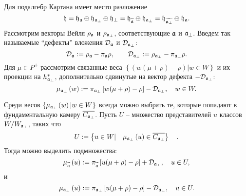 Для подалгебр Картана имеет место разложение
\begin{equation}
\frak{h}=\frak{\frak{h}_{\frak{a}}}\oplus \frak{h}_{\frak{a}_{\perp }}\oplus
\frak{h}_{\perp }=\frak{\frak{h}_{\widetilde{\frak{a}}}}\oplus \frak{h}_{%
\frak{a}_{\perp }}=\frak{\frak{h}_{\widetilde{\frak{a}_{\perp }}}}\oplus
\frak{h}_{\frak{a}}.
\end{equation}
Рассмотрим векторы Вейля  $\rho _{\frak{a}}$ и $\rho _{\frak{a}_{\perp}} $, соответствующие  $\frak{a}$ и $\frak{a}_{\perp }$.
Введем так называемые ``дефекты'' вложения  $\mathcal{D}_{\frak{a}}$ и $\mathcal{D}_{\frak{a}_{\perp }}$:
\begin{equation}
\mathcal{D}_{\frak{a}}:=\rho _{\frak{a}}-\pi _{\frak{a}}\rho , \qquad
\mathcal{D}_{\frak{a}_{\perp }}:=\rho _{\frak{a}_{\perp }}-\pi _{\frak{a}%
_{\perp }}\rho .  \label{defect ort}
\end{equation}
Для  $\mu \in P^{+}$ рассмотрим связанные веса  $\left\{\left( w(\mu +\rho )-\rho \right) |w\in W\right\} $ и их проекции на $h_{\frak{a}_{\perp }}^{\ast }$, дополнительно сдвинутые на вектор дефекта $-\mathcal{D}_{\frak{a}_{\perp }}$:
\begin{equation*}
\mu _{\frak{a}_{\perp }}\left( w\right) :=\pi _{\frak{a}_{\perp }}\left[
w(\mu +\rho )-\rho \right] -\mathcal{D}_{\frak{a}_{\perp }},\quad w\in W.
\end{equation*}

Среди весов  $\left\{ \mu _{\frak{a}_{\perp
}}\left( w\right) |w\in W\right\} $ всегда можно выбрать те, которые попадают в фундаментальную камеру $\overline{C_{\frak{a}_{\perp }}}$. Пусть $U$ -- множество представителей $u$ классов  $W/W_{\frak{a}_{\perp }}$, таких что
\begin{equation}
U:=\left\{ u\in W|\quad \mu _{\frak{a}_{\perp }}\left( u\right) \in
\overline{C_{\frak{a}_{\perp }}}\right\} \quad .  \label{U-def1}
\end{equation}
Тогда можно выделить подмножества:
\begin{equation}
\mu _{\widetilde{\mathfrak{a}}}\left( u\right) :=\pi _{\widetilde{%
\mathfrak{a}}}\left[ u(\mu +\rho )-\rho \right] +\mathcal{D}_{\frak{a}%
_{\perp }},\quad u\in U,  \label{mu-a}
\end{equation}
и
\begin{equation}
\mu _{\frak{a}_{\perp }}\left( u\right) :=\pi _{\frak{a}_{\perp }}\left[
u(\mu +\rho )-\rho \right] -\mathcal{D}_{\frak{a}_{\perp }},\quad u\in U.
\label{mu-a-tilda}
\end{equation}

